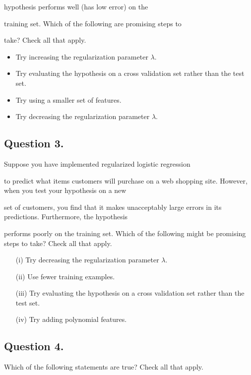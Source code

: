 \documentclass[11pt]{article} %
\begin{document}
hypothesis performs well (has low error) on the

training set. Which of the following are promising steps to

take? Check all that apply.

\begin{itemize}
\item 
Try increasing the regularization parameter $\lambda$.
\item 
Try evaluating the hypothesis on a cross validation set rather than the test set.
\item 
Try using a smaller set of features.
\item 
Try decreasing the regularization parameter $\lambda$.
\end{itemize}
\subsection*{Question 3. }
Suppose you have implemented regularized logistic regression

to predict what items customers will purchase on a web shopping site. However, when you test your hypothesis on a new

set of customers, you find that it makes unacceptably large errors in its predictions. Furthermore, the hypothesis

performs poorly on the training set. Which of the following might be promising steps to take? Check all that apply.

\begin{itemize}
\item[(i)] Try decreasing the regularization parameter $\lambda$.

\item[(ii)] Use fewer training examples.

\item[(iii)] Try evaluating the hypothesis on a cross validation set rather than the test set.

\item[(iv)] Try adding polynomial features.
\end{itemize}
\subsection*{Question 4. }
Which of the following statements are true? Check all that apply.
\end{document}
